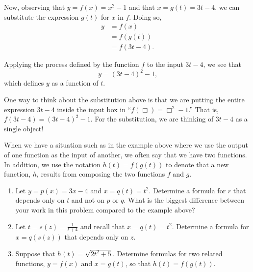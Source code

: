 \documentclass{ximera}
\begin{document}
\begin{example}
\begin{explanation}
Now, observing that $y = f(x) = x^2 - 1$ and that $x = g(t) = 3t - 4$, we can substitute the expression $g(t)$ for $x$ in $f$.  Doing so,%
\begin{align*}
y &= f(x)\\
&= f(g(t))\\
&= f(3t-4)\text{.}
\end{align*}

Applying the process defined by the function $f$ to the input $3t-4$, we see that%
\begin{equation*}
y = (3t-4)^2 - 1\text{,}
\end{equation*}
which defines $y$ as a function of $t$.

One way to think about the substitution above is that we are putting the entire expression $3t-4$ inside the input box in ``$f(\Box) = \Box^2 - 1$.''   That is, $f \left( \boxed{3t-4} \right) = \left( \boxed{3t-4} \right) ^2 -1$.  For the substitution, we are thinking of $3t-4$ as a single object! 

\end{explanation}
\end{example}

When we have a situation such as in the example above where we use the output of one function as the input of another, we often say that we have  two functions.  In addition, we use the notation $h(t) = f(g(t))$ to denote that a new function, $h$, results from composing the two functions $f$ and $g$.


\begin{exploration}
\begin{enumerate}[label=\alph*.]
\item Let $y = p(x) = 3x - 4$ and $x = q(t) = t^2$.   Determine a formula for $r$ that depends only on $t$ and not on $p$ or $q$.  What is the biggest difference between your work in this problem compared to the example above?
\item Let $t = s(z) = \frac{1}{t+4}$ and recall that $x = q(t) = t^2$.  Determine a formula for $x = q(s(z))$ that depends only on $z$.
\item Suppose that $h(t) = \sqrt{2t^2 + 5}$.  Determine formulas for two related functions, $y = f(x)$ and $x = g(t)$, so that $h(t) = f(g(t))$.
\end{enumerate}
\end{exploration}


\end{document}
